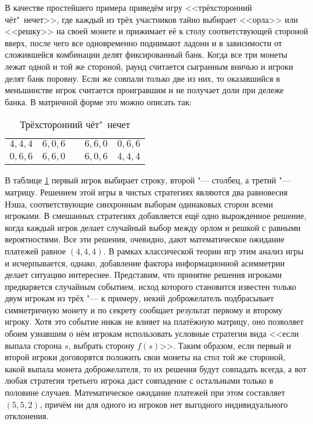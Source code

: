 В качестве простейшего примера приведём игру <<трёхсторонний чёт"~нечет>>, где каждый из трёх участников тайно выбирает <<орла>> или <<решку>> на своей монете и прижимает её к столу соответствующей стороной вверх, после чего все одновременно поднимают ладони и в зависимости от сложившейся комбинации делят фиксированный банк. Когда все три монеты лежат одной и той же стороной, раунд считается сыгранным вничью и игроки делят банк поровну. Если же совпали только две из них, то оказавшийся в меньшинстве игрок считается проигравшим и не получает доли при дележе банка. В матричной форме это можно описать так:
\begin{table} [htbp]
	\centering
	\begin{threeparttable}
		\caption{Трёхсторонний чёт"~нечет}
		\label{tab:coin3}
		\begin{tabular}{ |c|c|c|c|c| }
			\cline{1-2} \cline{4-5}
			\rule[-7pt]{0pt}{2em}$4, 4, 4$ &
			\rule[-7pt]{0pt}{2em}$6, 0, 6$ & \qquad\qquad\qquad &
			\rule[-7pt]{0pt}{2em}$6, 6, 0$ &
			\rule[-7pt]{0pt}{2em}$0, 6, 6$ \\
			\cline{1-2} \cline{4-5}
			\rule[-7pt]{0pt}{2em}$0, 6, 6$ &
			\rule[-7pt]{0pt}{2em}$6, 6, 0$ & \qquad\qquad\qquad &
			\rule[-7pt]{0pt}{2em}$6, 0, 6$ &
			\rule[-7pt]{0pt}{2em}$4, 4, 4$ \\
			\cline{1-2} \cline{4-5}
		\end{tabular}
	\end{threeparttable}
\end{table}

В таблице \ref{tab:coin3} первый игрок выбирает строку, второй "--- столбец, а третий "--- матрицу. Решением этой игры в чистых стратегиях являются два равновесия Нэша, соответствующие синхронным выборам одинаковых сторон всеми игроками. В смешанных стратегиях добавляется ещё одно вырожденное решение, когда каждый игрок делает случайный выбор между орлом и решкой с равными вероятностями. Все эти решения, очевидно, дают математическое ожидание платежей равное $(4,4,4)$. В рамках классической теории игр этим анализ игры и исчерпывается, однако, добавление фактора информационной асимметрии делает ситуацию интереснее. Представим, что принятие решения игроками предваряется случайным событием, исход которого становится известен только двум игрокам из трёх "--- к примеру, некий доброжелатель подбрасывает симметричную монету и по секрету сообщает результат первому и второму игроку. Хотя это событие никак не влияет на платёжную матрицу, оно позволяет обоим узнавшим о нём игрокам использовать условные стратегии вида <<если выпала сторона $s$, выбрать сторону $f(s)$>>. Таким образом, если первый и второй игроки договорятся положить свои монеты на стол той же стороной, какой выпала монета доброжелателя, то их решения будут совпадать всегда, а вот любая стратегия третьего игрока даст совпадение с остальными только в половине случаев. Математическое ожидание платежей при этом составляет $(5,5,2)$, причём ни для одного из игроков нет выгодного индивидуального отклонения.

